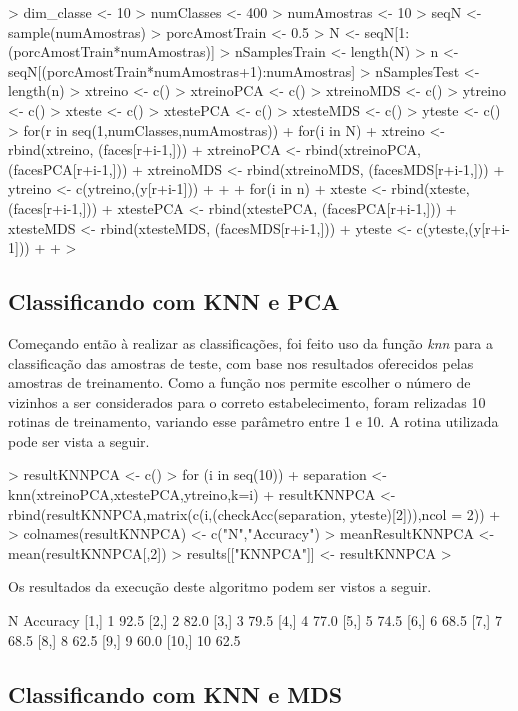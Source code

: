\documentclass[12pt,a4paper,titlepage]{article}
\begin{document}
\begin{Schunk}
\begin{Sinput}
> dim_classe <- 10
> numClasses <- 400
> numAmostras <- 10
> seqN <- sample(numAmostras)
> porcAmostTrain <- 0.5
> N <- seqN[1:(porcAmostTrain*numAmostras)]
> nSamplesTrain <- length(N)
> n <- seqN[(porcAmostTrain*numAmostras+1):numAmostras]
> nSamplesTest <- length(n)
> xtreino <- c()
> xtreinoPCA <- c()
> xtreinoMDS <- c()
> ytreino <- c()
> xteste <- c()
> xtestePCA <- c()
> xtesteMDS <- c()
> yteste <- c()
> for(r in seq(1,numClasses,numAmostras)) {
+     for(i in N) {
+         xtreino <- rbind(xtreino, (faces[r+i-1,]))
+         xtreinoPCA <- rbind(xtreinoPCA, (facesPCA[r+i-1,]))
+         xtreinoMDS <- rbind(xtreinoMDS, (facesMDS[r+i-1,]))
+         ytreino <- c(ytreino,(y[r+i-1]))
+     }
+     
+     for(i in n) {
+         xteste <- rbind(xteste, (faces[r+i-1,]))
+         xtestePCA <- rbind(xtestePCA, (facesPCA[r+i-1,]))
+         xtesteMDS <- rbind(xtesteMDS, (facesMDS[r+i-1,]))
+         yteste <- c(yteste,(y[r+i-1]))
+     }
+ }
> 
\end{Sinput}
\end{Schunk}

\subsection{Classificando com KNN e PCA}

Começando então à realizar as classificações, foi feito uso da função \textit{knn} para a classificação das amostras de teste, com base nos resultados oferecidos pelas amostras de treinamento. Como a função nos permite escolher o número de vizinhos a ser considerados para o correto estabelecimento, foram relizadas 10 rotinas de treinamento, variando esse parâmetro entre 1 e 10. A rotina utilizada pode ser vista a seguir.

\begin{Schunk}
\begin{Sinput}
> resultKNNPCA <- c()
> for (i in seq(10)) {
+     separation <- knn(xtreinoPCA,xtestePCA,ytreino,k=i)
+     resultKNNPCA <- rbind(resultKNNPCA,matrix(c(i,(checkAcc(separation, yteste)[2])),ncol = 2))
+ }
> colnames(resultKNNPCA) <- c("N","Accuracy")
> meanResultKNNPCA <- mean(resultKNNPCA[,2])
> results[["KNNPCA"]] <- resultKNNPCA
> 
\end{Sinput}
\end{Schunk}


Os resultados da execução deste algoritmo podem ser vistos a seguir.

\begin{Schunk}
\begin{Soutput}
       N Accuracy
 [1,]  1     92.5
 [2,]  2     82.0
 [3,]  3     79.5
 [4,]  4     77.0
 [5,]  5     74.5
 [6,]  6     68.5
 [7,]  7     68.5
 [8,]  8     62.5
 [9,]  9     60.0
[10,] 10     62.5
\end{Soutput}
\end{Schunk}

\subsection{Classificando com KNN e MDS}
\end{document}
